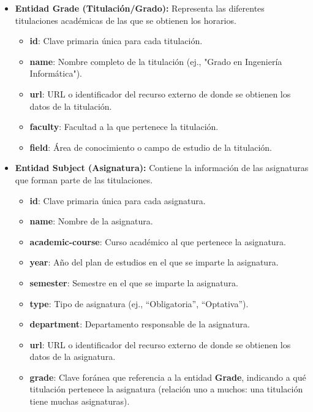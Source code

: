 \begin{itemize}
    \item \textbf{Entidad Grade (Titulación/Grado):}
    Representa las diferentes titulaciones académicas de las que se obtienen los horarios.
    \begin{itemize}
        \item \textbf{id}: Clave primaria única para cada titulación.
        \item \textbf{name}: Nombre completo de la titulación (ej., "Grado en Ingeniería Informática").
        \item \textbf{url}: URL o identificador del recurso externo de donde se obtienen los datos de la titulación.
        \item \textbf{faculty}: Facultad a la que pertenece la titulación.
        \item \textbf{field}: Área de conocimiento o campo de estudio de la titulación.
    \end{itemize}

    \item \textbf{Entidad Subject (Asignatura):}
    Contiene la información de las asignaturas que forman parte de las titulaciones.
    \begin{itemize}
        \item \textbf{id}: Clave primaria única para cada asignatura.
        \item \textbf{name}: Nombre de la asignatura.
        \item \textbf{academic-course}: Curso académico al que pertenece la asignatura.
        \item \textbf{year}: Año del plan de estudios en el que se imparte la asignatura.
        \item \textbf{semester}: Semestre en el que se imparte la asignatura.
        \item \textbf{type}: Tipo de asignatura (ej., ``Obligatoria'', ``Optativa'').
        \item \textbf{department}: Departamento responsable de la asignatura.
        \item \textbf{url}: URL o identificador del recurso externo de donde se obtienen los datos de la asignatura.
        \item \textbf{grade}: Clave foránea que referencia a la entidad \textbf{Grade}, indicando a qué titulación pertenece la asignatura (relación uno a muchos: una titulación tiene muchas asignaturas).
    \end{itemize}


\end{itemize}
